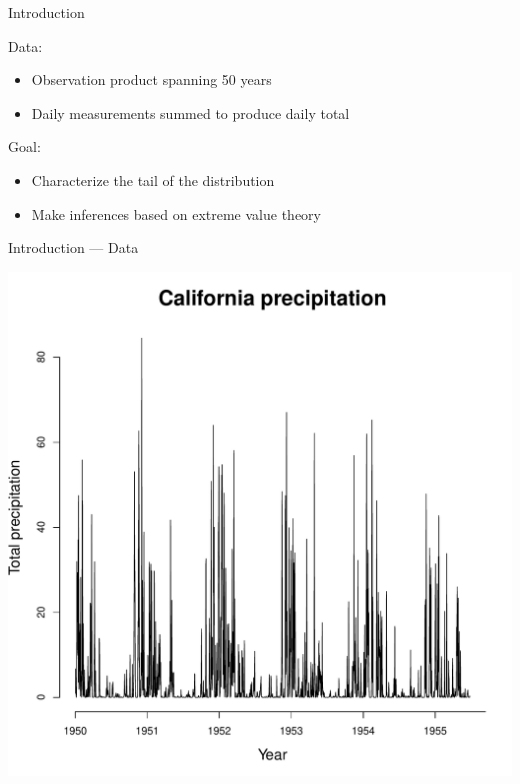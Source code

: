\documentclass[mathserif, 11pt, t]{beamer}
\begin{document}

\begin{frame}{Introduction}

Data:
\begin{itemize}[label=$\cdot$]
\item Observation product spanning 50 years
\item Daily measurements summed to produce daily total
\end{itemize}
\bigskip

Goal:
\begin{itemize}[label=$\cdot$]
\item Characterize the tail of the distribution
\item Make inferences based on extreme value theory
\end{itemize}
\end{frame}

\begin{frame}{Introduction --- Data}
\begin{center}
\includegraphics[scale=0.30]{../figs/data.pdf}
\end{center}
\end{frame}
\end{document}
